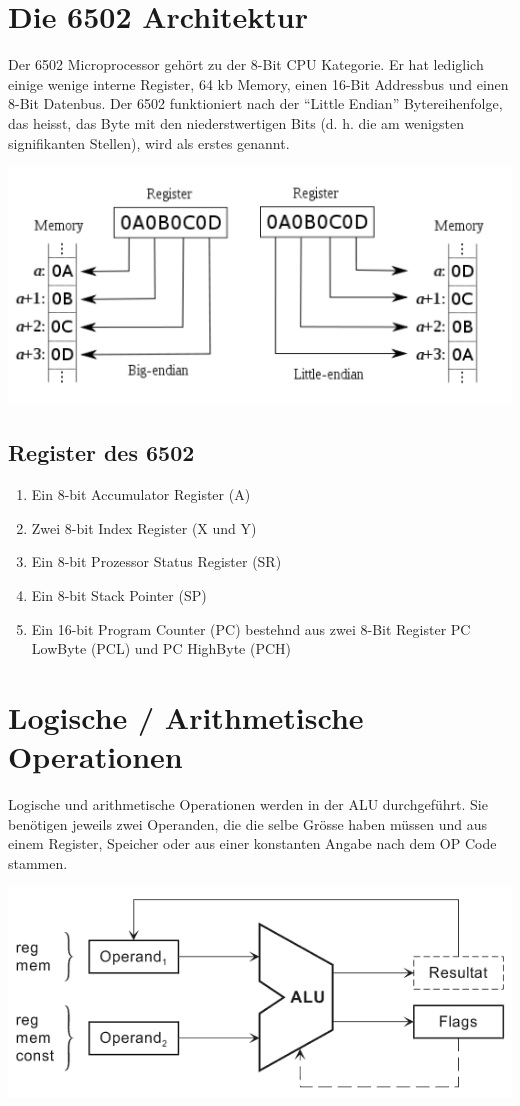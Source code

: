 \documentclass[a4paper,10pt]{report}
\begin{document}
\section{Die 6502 Architektur}
Der 6502 Microprocessor gehört zu der 8-Bit CPU Kategorie. Er hat lediglich einige wenige interne Register, 64 kb Memory, einen 16-Bit Addressbus und einen 8-Bit Datenbus. Der 6502 funktioniert nach der "`Little Endian"' Bytereihenfolge, das heisst, das Byte mit den niederstwertigen Bits (d. h. die am wenigsten signifikanten Stellen), wird als erstes genannt.
\begin{center}\includegraphics[scale=0.85]{imgs/Endian.png}\end{center}
\subsection{Register des 6502}
\begin{enumerate}
	\item Ein 8-bit Accumulator Register (A)
	\item Zwei 8-bit Index Register (X und Y)
	\item Ein 8-bit Prozessor Status Register (SR)
	\item Ein 8-bit Stack Pointer (SP)
	\item Ein 16-bit Program Counter (PC) bestehnd aus zwei 8-Bit Register PC LowByte (PCL) und PC HighByte (PCH)
\end{enumerate}
\section{Logische / Arithmetische Operationen}
	Logische und arithmetische Operationen werden in der ALU durchgeführt. Sie benötigen jeweils zwei Operanden, die die selbe Grösse haben müssen und aus einem Register, Speicher oder aus einer konstanten Angabe nach dem OP Code stammen.
\begin{center}
\includegraphics[scale=0.75]{imgs/AsmDatenfluss.png}
\end{center}
\end{document}

